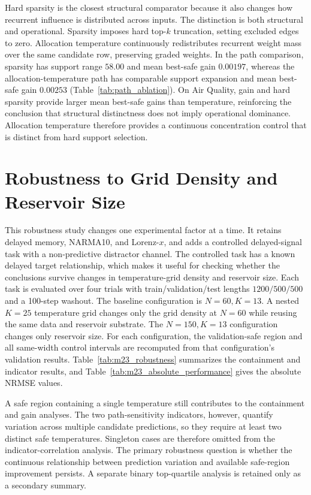 \documentclass[11pt,a4paper]{article}
\begin{document}
Hard sparsity is the closest structural comparator because it also changes how recurrent influence is distributed across inputs. The distinction is both structural and operational. Sparsity imposes hard top-$k$ truncation, setting excluded edges to zero. Allocation temperature continuously redistributes recurrent weight mass over the same candidate row, preserving graded weights. In the path comparison, sparsity has support range $58.00$ and mean best-safe gain $0.00197$, whereas the allocation-temperature path has comparable support expansion and mean best-safe gain $0.00253$ (Table~\ref{tab:path_ablation}). On Air Quality, gain and hard sparsity provide larger mean best-safe gains than temperature, reinforcing the conclusion that structural distinctness does not imply operational dominance. Allocation temperature therefore provides a continuous concentration control that is distinct from hard support selection.


\section{Robustness to Grid Density and Reservoir Size}
\label{sec:grid_size_robustness}

This robustness study changes one experimental factor at a time. It retains delayed memory, NARMA10, and Lorenz-$x$, and adds a controlled delayed-signal task with a non-predictive distractor channel. The controlled task has a known delayed target relationship, which makes it useful for checking whether the conclusions survive changes in temperature-grid density and reservoir size. Each task is evaluated over four trials with train/validation/test lengths $1200/500/500$ and a 100-step washout. The baseline configuration is $N=60,K=13$. A nested $K=25$ temperature grid changes only the grid density at $N=60$ while reusing the same data and reservoir substrate. The $N=150,K=13$ configuration changes only reservoir size. For each configuration, the validation-safe region and all same-width control intervals are recomputed from that configuration's validation results. Table~\ref{tab:m23_robustness} summarizes the containment and indicator results, and Table~\ref{tab:m23_absolute_performance} gives the absolute NRMSE values.

A safe region containing a single temperature still contributes to the containment and gain analyses. The two path-sensitivity indicators, however, quantify variation across multiple candidate predictions, so they require at least two distinct safe temperatures. Singleton cases are therefore omitted from the indicator-correlation analysis. The primary robustness question is whether the continuous relationship between prediction variation and available safe-region improvement persists. A separate binary top-quartile analysis is retained only as a secondary summary.
\end{document}
